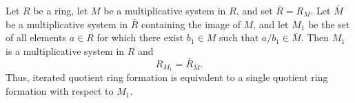Let $R$ be a ring, let $M$ be a multiplicative system in $R$, and set $\bar{R} = R_M$. Let $\bar{M}$ be a multiplicative system in $\bar{R}$ containing the image of $M$, and let $M_1$ be the set of all elements $a \in R$ for which there exist $b_1 \in M$ such that $a/b_1 \in \bar{M}$. Then $M_1$ is a multiplicative system in $R$ and
$$
R_{M_1} = \bar{R}_{\bar{M}}.
$$
Thus, iterated quotient ring formation is equivalent to a single quotient ring formation with respect to $M_1$.
